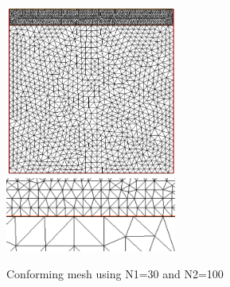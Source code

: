 \documentclass{article}
\begin{document}
\begin{figure}[H] \label{fig:mesh_nonconf}
	\includegraphics[width=0.5\textwidth]{imgs/non-confroming_mesh_100_30.PNG}
	\includegraphics[width=0.5\textwidth]{imgs/non-conforming_mesh_intersection.PNG}
	\caption{Conforming mesh using
	N1=30 and N2=100}
\end{figure}
\end{document}
